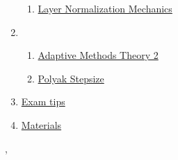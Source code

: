 \documentclass[11pt]{article}
\renewcommand{\today}{\shortmonthname[\the\month] \the \day,  \the\year}
\begin{document}
\begin{enumerate}
\begin{enumerate}
		\item  \href{https://mp.weixin.qq.com/s/KHP98i56Z5VQcvJdgM2PjA}{Layer Normalization Mechanics} %
	\end{enumerate}
	\item  %
	\begin{enumerate}
		\item \href{https://mp.weixin.qq.com/s/Zij7eMYXTGRoKcHpLv1wjQ}{Adaptive Methods Theory 2} %
		\item  \href{https://mp.weixin.qq.com/s/P0vPBZLS3sCyE1fsJOhz-g}{Polyak Stepsize} %
	\end{enumerate}
	\item  \href{https://mp.weixin.qq.com/s/KW2hehq8AOZQntKslhIjqw}{Exam tips} %
	\item \href{https://pan.baidu.com/s/1GlLVHIGZNnlFLNxZdQcq4w}{Materials}
\end{enumerate}

%
\begin{flushright}
	\tiny \today 
\end{flushright}
\end{document}
